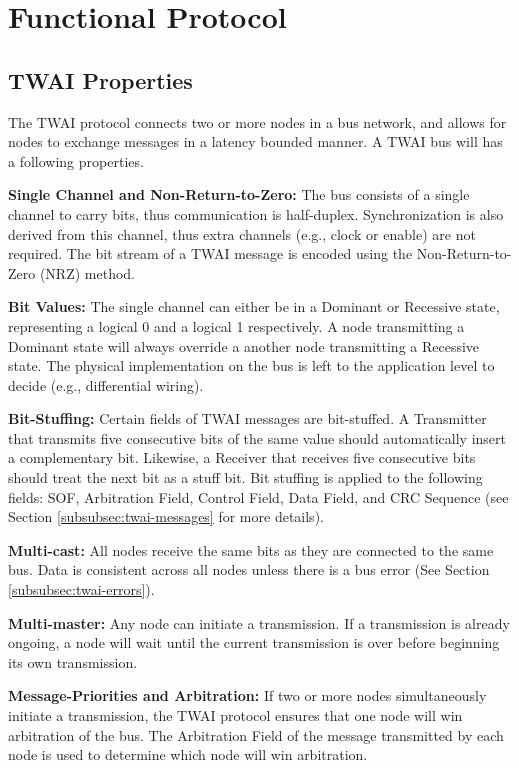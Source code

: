 \documentclass[main\_\_EN.tex]{subfiles}
\begin{document}
\section{Functional Protocol}
\label{subsec:protocol-description}
\subsection{TWAI Properties}
The TWAI protocol connects two or more nodes in a bus network, and allows for nodes to exchange messages in a latency bounded manner. A TWAI bus will has a following properties.

{\bfseries Single Channel and Non-Return-to-Zero:} The bus consists of a single channel to carry bits, thus communication is half-duplex. Synchronization is also derived from this channel, thus extra channels (e.g., clock or enable) are not required. The bit stream of a TWAI message is encoded using the Non-Return-to-Zero (NRZ) method.

{\bfseries Bit Values:} The single channel can either be in a Dominant or Recessive state, representing a logical 0 and a logical 1 respectively. A node transmitting a Dominant state will always override a another node transmitting a Recessive state. The physical implementation on the bus is left to the application level to decide (e.g., differential wiring).

{\bfseries Bit-Stuffing:} Certain fields of TWAI messages are bit-stuffed. A Transmitter that transmits five consecutive bits of the same value should automatically insert a complementary bit. Likewise, a Receiver that receives five consecutive bits should treat the next bit as a stuff bit. Bit stuffing is applied to the following fields: SOF, Arbitration Field, Control Field, Data Field, and CRC Sequence (see Section \ref{subsubsec:twai-messages} for more details).

{\bfseries Multi-cast:} All nodes receive the same bits as they are connected to the same bus. Data is consistent across all nodes unless there is a bus error (See Section \ref{subsubsec:twai-errors}).

{\bfseries Multi-master:} Any node can initiate a transmission. If a transmission is already ongoing, a node will wait until the current transmission is over before beginning its own transmission.

{\bfseries Message-Priorities and Arbitration:} If two or more nodes simultaneously initiate a transmission, the TWAI protocol ensures that one node will win arbitration of the bus. The Arbitration Field of the message transmitted by each node is used to determine which node will win arbitration.
\end{document}
